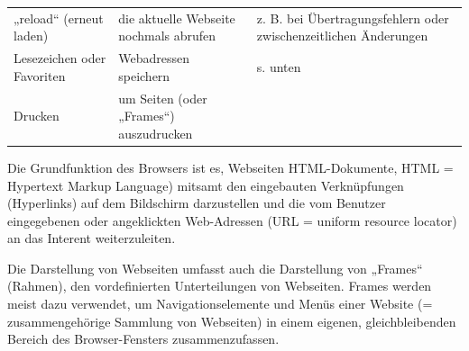 \documentclass[]{book}
\theoremstyle{definition}
\theoremstyle{definition}
\theoremstyle{definition}
\theoremstyle{remark}
\begin{document}
\begin{longtable}[]{@{}lll@{}}
\begin{minipage}[t]{0.31\columnwidth}\raggedright\strut
„reload`` (erneut laden) \vspace{5mm}\strut
\end{minipage} & \begin{minipage}[t]{0.27\columnwidth}\raggedright\strut
die aktuelle Webseite nochmals abrufen \vspace{5mm}\strut
\end{minipage} & \begin{minipage}[t]{0.33\columnwidth}\raggedright\strut
z. B. bei Übertragungsfehlern oder zwischenzeitlichen Änderungen
\vspace{5mm}\strut
\end{minipage}\tabularnewline
\begin{minipage}[t]{0.31\columnwidth}\raggedright\strut
Lesezeichen oder Favoriten \vspace{5mm}\strut
\end{minipage} & \begin{minipage}[t]{0.27\columnwidth}\raggedright\strut
Webadressen speichern \vspace{5mm}\strut
\end{minipage} & \begin{minipage}[t]{0.33\columnwidth}\raggedright\strut
s. unten \vspace{5mm}\strut
\end{minipage}\tabularnewline
\begin{minipage}[t]{0.31\columnwidth}\raggedright\strut
Drucken \vspace{5mm}\strut
\end{minipage} & \begin{minipage}[t]{0.27\columnwidth}\raggedright\strut
um Seiten (oder „Frames``) auszudrucken \vspace{5mm}\strut
\end{minipage} & \begin{minipage}[t]{0.33\columnwidth}\raggedright\strut
\strut
\end{minipage}\tabularnewline
\bottomrule
\end{longtable}

Die Grundfunktion des Browsers ist es, Webseiten HTML-Dokumente, HTML =
Hypertext Markup Language) mitsamt den eingebauten Verknüpfungen
(Hyperlinks) auf dem Bildschirm darzustellen und die vom Benutzer
eingegebenen oder angeklickten Web-Adressen (URL = uniform resource
locator) an das Interent weiterzuleiten.

Die Darstellung von Webseiten umfasst auch die Darstellung von „Frames``
(Rahmen), den vordefinierten Unterteilungen von Webseiten. Frames werden
meist dazu verwendet, um Navigationselemente und Menüs einer Website (=
zusammengehörige Sammlung von Webseiten) in einem eigenen,
gleichbleibenden Bereich des Browser-Fensters zusammenzufassen.
\end{document}
